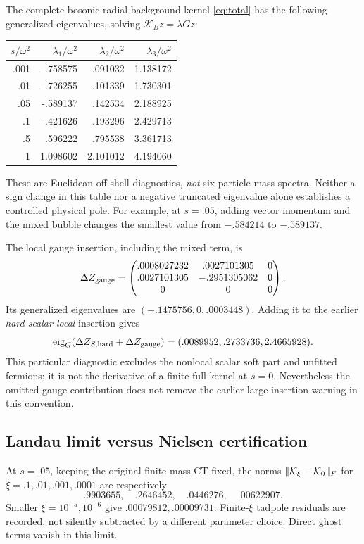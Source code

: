 \documentclass[11pt]{article}
\begin{document}
The complete bosonic radial background kernel \eqref{eq:total} has the
following generalized eigenvalues, solving $\mathcal K_Bz=\lambda Gz$:
\begin{center}
\begin{tabular}{rrrr}
\toprule
$s/\omega^2$&$\lambda_1/\omega^2$&$\lambda_2/\omega^2$&$\lambda_3/\omega^2$\\
\midrule
.001&-.758575&.091032&1.138172\\
.01 &-.726255&.101339&1.730301\\
.05 &-.589137&.142534&2.188925\\
.1  &-.421626&.193296&2.429713\\
.5  & .596222&.795538&3.361713\\
1   &1.098602&2.101012&4.194060\\
\bottomrule
\end{tabular}
\end{center}
These are Euclidean off-shell diagnostics, \emph{not} six particle
mass spectra. Neither a sign change in this table nor a negative
truncated eigenvalue alone establishes a controlled physical pole.
For example, at $s=.05$, adding vector momentum and the mixed bubble
changes the smallest value from $-.584214$ to $-.589137$.

The local gauge insertion, including the mixed term, is
\begin{equation}
 \Delta Z_{\rm gauge}=
 \begin{pmatrix}
 .0008027232&.0027101305&0\\
 .0027101305&-.2951305062&0\\
 0&0&0
 \end{pmatrix}.
\end{equation}
Its generalized eigenvalues are $(-.1475756,0,.0003448)$.
Adding it to the earlier \emph{hard scalar local} insertion gives
\begin{equation}
 \operatorname{eig}_G(\Delta Z_{S,\rm hard}+\Delta Z_{\rm gauge})
       =(.0089952,.2733736,2.4665928).
\end{equation}
This particular diagnostic excludes the nonlocal scalar soft part and
unfitted fermions; it is not the derivative of a finite full kernel at
$s=0$. Nevertheless the omitted gauge contribution does not remove
the earlier large-insertion warning in this convention.

\subsection{Landau limit versus Nielsen certification}
At $s=.05$, keeping the original finite mass CT fixed, the norms
$\|{\cal K}_\xi-{\cal K}_0\|_F$ for
$\xi=.1,.01,.001,.0001$ are respectively
\[
 .9903655,\quad .2646452,\quad .0446276,\quad .00622907.
\]
Smaller $\xi=10^{-5},10^{-6}$ give $.00079812,.00009731$.
Finite-$\xi$ tadpole residuals are recorded, not silently
subtracted by a different parameter choice. Direct ghost terms vanish
in this limit.
\end{document}
